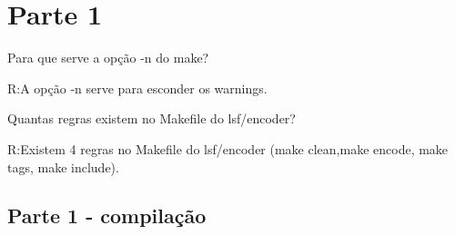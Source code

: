 \documentclass[10pt,a4paper]{article}
\begin{document}
\setlength{\parskip}{0pt}
\setlength{\parsep}{0pt}
\setlength{\headsep}{0pt}
\setlength{\topskip}{0pt}
\setlength{\topmargin}{0pt}
\setlength{\topsep}{0pt}
\setlength{\partopsep}{0pt}


\begin{minipage}{5cm}
  \vspace{2mm}
\end{minipage}

\vspace{-3mm}

\section{Parte 1}
Para que serve a opção -n do make?

R:A opção -n serve para esconder os warnings.

Quantas regras existem no Makefile do lsf/encoder?

R:Existem 4 regras no Makefile do lsf/encoder (make clean,make encode, make tags, make include).

\subsection{Parte 1 - compilação}
\end{document}
